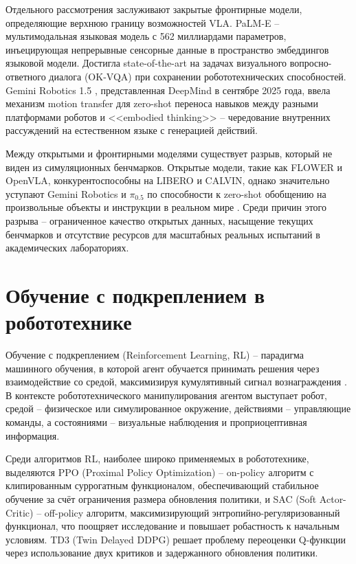     Отдельного рассмотрения заслуживают закрытые фронтирные модели, определяющие верхнюю границу возможностей VLA. PaLM-E \cite{driess2023palme} -- мультимодальная языковая модель с 562 миллиардами параметров, инъецирующая непрерывные сенсорные данные в пространство эмбеддингов языковой модели. Достигла state-of-the-art на задачах визуального вопросно-ответного диалога (OK-VQA) при сохранении робототехнических способностей. Gemini Robotics 1.5 \cite{deepmind2025gemini}, представленная DeepMind в сентябре 2025 года, ввела механизм motion transfer для zero-shot переноса навыков между разными платформами роботов и <<embodied thinking>> -- чередование внутренних рассуждений на естественном языке с генерацией действий.

    Между открытыми и фронтирными моделями существует разрыв, который не виден из симуляционных бенчмарков. Открытые модели, такие как FLOWER и OpenVLA, конкурентоспособны на LIBERO и CALVIN, однако значительно уступают Gemini Robotics и $\pi_{0.5}$ по способности к zero-shot обобщению на произвольные объекты и инструкции в реальном мире \cite{reuss2025blog}. Среди причин этого разрыва -- ограниченное качество открытых данных, насыщение текущих бенчмарков и отсутствие ресурсов для масштабных реальных испытаний в академических лабораториях.

\section{Обучение с подкреплением в робототехнике}
\label{sec:rl}

    Обучение с подкреплением (Reinforcement Learning, RL) -- парадигма машинного обучения, в которой агент обучается принимать решения через взаимодействие со средой, максимизируя кумулятивный сигнал вознаграждения \cite{sutton2018rl}. В контексте робототехнического манипулирования агентом выступает робот, средой -- физическое или симулированное окружение, действиями -- управляющие команды, а состояниями -- визуальные наблюдения и проприоцептивная информация.

    Среди алгоритмов RL, наиболее широко применяемых в робототехнике, выделяются PPO (Proximal Policy Optimization) \cite{schulman2017ppo} -- on-policy алгоритм с клипированным суррогатным функционалом, обеспечивающий стабильное обучение за счёт ограничения размера обновления политики, и SAC (Soft Actor-Critic) \cite{haarnoja2018sac} -- off-policy алгоритм, максимизирующий энтропийно-регуляризованный функционал, что поощряет исследование и повышает робастность к начальным условиям. TD3 (Twin Delayed DDPG) \cite{fujimoto2018td3} решает проблему переоценки Q-функции через использование двух критиков и задержанного обновления политики.

